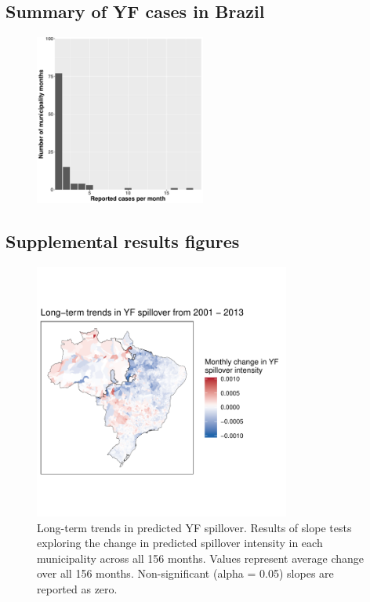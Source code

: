 \documentclass{article}
\begin{document}
\subsection{Summary of YF cases in Brazil}


\begin{figure} [h]
\centering
\includegraphics[width=0.5\textwidth]{Hist_Reported_Cases}
\caption{}
\label{}
\end{figure}

\subsection{Supplemental results figures}

\begin{figure}
\centering
\includegraphics[width=0.75\textwidth]{trendsAcrossSpace_156months}
\caption{Long-term trends in predicted YF spillover. Results of slope tests exploring the change in predicted spillover intensity in each municipality across all 156 months. Values represent average change over all 156 months. Non-significant (alpha = 0.05) slopes are reported as zero.}
\label{trends156}
\end{figure}
\end{document}
